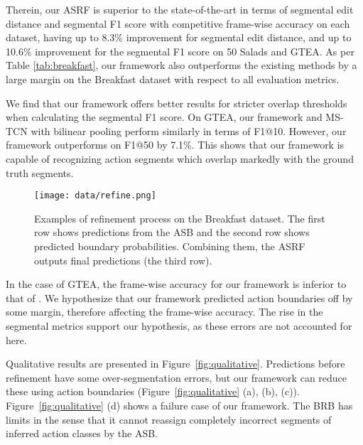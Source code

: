 \documentclass[10pt,twocolumn,letterpaper]{article}
\begin{document}
Therein, our ASRF is superior to the state-of-the-art in terms of segmental edit distance and segmental F1 score with competitive frame-wise accuracy on each dataset,
having up to 8.3\% improvement for segmental edit distance, and up to 10.6\% improvement for the segmental F1 score on 50 Salads and GTEA.
As per Table \ref{tab:breakfast}, our framework also outperforms the existing methods by a large margin on the Breakfast dataset with respect to all evaluation metrics.

We find that our framework offers better results for stricter overlap thresholds when calculating the segmental F1 score.
On GTEA, our framework and MS-TCN with bilinear pooling \cite{bpgaussian} perform similarly in terms of F1@10.
However, our framework outperforms \cite{bpgaussian} on F1@50 by 7.1\%.
This shows that our framework is capable of recognizing action segments which overlap markedly with the ground truth segments.


\begin{figure*}[h]
    \small
    \begin{center}
    \texttt{[image: data/refine.png]}
    \end{center}
    \caption{Examples of refinement process on the Breakfast dataset. The first row shows predictions from the ASB and the second row shows predicted boundary probabilities.
    Combining them, the ASRF outputs final predictions (the third row).}
    \label{fig:refine}
    \vspace{-5pt}
\end{figure*}

In the case of GTEA, the frame-wise accuracy for our framework is inferior to that of \cite{bpgaussian}.
We hypothesize that our framework predicted action boundaries off by some margin, therefore affecting the frame-wise accuracy.
The rise in the segmental metrics support our hypothesis, as these errors are not accounted for here.


Qualitative results are presented in Figure~\ref{fig:qualitative}. 
Predictions before refinement have some over-segmentation errors, but our framework can reduce these using action boundaries (Figure~\ref{fig:qualitative} (a), (b), (c)).
Figure~\ref{fig:qualitative} (d) shows a failure case of our framework.
The BRB has limits in the sense that it cannot reassign completely incorrect segments
of inferred action classes by the ASB.
\end{document}
